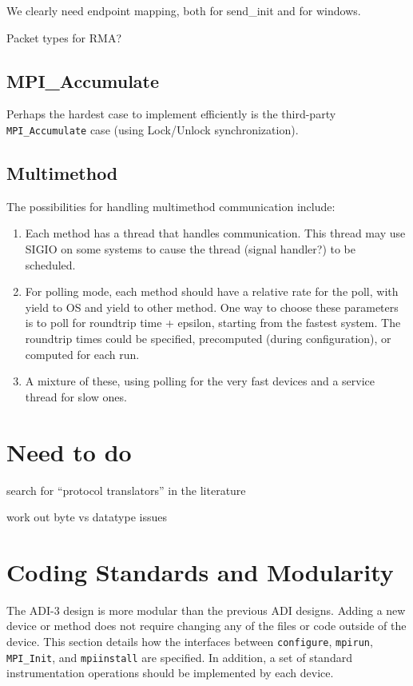 \documentclass{article}
\let\code=\texttt
\begin{document}
We clearly need endpoint mapping, both for send\_init and for windows.

Packet types for RMA?

\subsection{MPI\_Accumulate}
Perhaps the hardest case to implement efficiently is the third-party
\code{MPI\_Accumulate} case (using Lock/Unlock synchronization).

\subsection{Multimethod}

The possibilities for handling multimethod communication include:
\begin{enumerate}
\item Each method has a thread that handles communication.  This thread may
  use SIGIO on some systems to cause the thread (signal handler?) to be
  scheduled. 
\item For polling mode, each method should have a relative rate for the poll,
  with yield to OS and yield to other method.  One way to choose these
  parameters is to poll for roundtrip time + epsilon, starting from the
  fastest system.  The roundtrip times could be specified, precomputed (during
  configuration), or computed for each run.
\item A mixture of these, using polling for the very fast devices and a
  service thread for slow ones.
\end{enumerate}

\section{Need to do}

search for ``protocol translators'' in the literature

work out byte vs datatype issues


\section{Coding Standards and Modularity}
The ADI-3 design is more modular than the previous ADI designs.  Adding a new
device or method does not require changing any of the files or code outside
of the device.  This section details how the interfaces between
\code{configure}, \code{mpirun}, \code{MPI\_Init}, and \code{mpiinstall} are
specified.  In addition, a set of standard instrumentation operations should
be implemented by each device.
\end{document}
